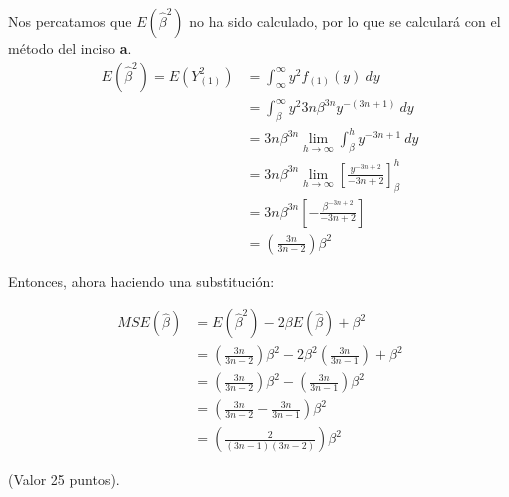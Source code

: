 \begin{enumerate}
\begin{solution}
    \linea 
    
    Nos percatamos que $E(\hat{\beta}^2)$ no ha sido calculado, por lo que se calculará con el método del inciso \textbf{a}. 
    \begin{align*}
    E(\hat{\beta}^2)= E(Y_{(1)}^2) &= \int_{\infty}^{\infty} y^2 f_{(1)}(y) \ d y\\
                   &= \int_{\beta}^{\infty} y^2 3n\beta^{3n}y^{-(3n+1)} \ dy\\
                   &= 3n\beta^{3n}\lim_{h\to \infty}\int_{\beta}^{h} y^{-3n+1} \ dy\\
                   &= 3n\beta^{3n}\lim_{h\to \infty}\left[\frac{y^{-3n+2}}{-3n+2}\right]_\beta^h\\
                   &= 3n\beta^{3n}\left[-\frac{\beta^{-3n+2}}{-3n+2}\right]\\
                   &= \left(\frac{3n}{3n-2}\right)\beta^2
    \end{align*}
    
    \linea 
    
    Entonces, ahora haciendo una substitución:
    
    \begin{align*}
        MSE(\hat{\beta})&=E(\hat{\beta}^2)-2\beta E(\hat{\beta})+\beta^2\\
                        &= \left(\frac{3n}{3n-2}\right)\beta^2 -2\beta^2\left(\frac{3n}{3n-1}\right) +\beta^2\\
                        &= \left(\frac{3n}{3n-2}\right)\beta^2 -\left(\frac{3n}{3n-1}\right)\beta^2\\
                        &= \left(\frac{3n}{3n-2}-\frac{3n}{3n-1}\right)\beta^2\\
                        &= \left(\frac{2}{(3n-1)(3n-2)}\right)\beta^2
    \end{align*}
    
    \end{solution}
\end{enumerate}
(Valor 25 puntos).

